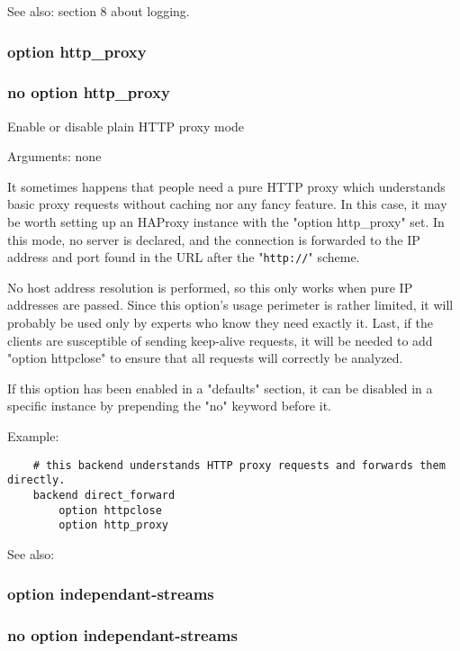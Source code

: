   See also:  section 8 about logging.

\subsubsection[option http\_proxy]{option http\_proxy}
\subsubsection[no option http\_proxy]{no option http\_proxy}


  Enable or disable plain HTTP proxy mode

                                 
  Arguments: none

  It sometimes happens that people need a pure HTTP proxy which understands
  basic proxy requests without caching nor any fancy feature. In this case,
  it may be worth setting up an HAProxy instance with the "option http\_proxy"
  set. In this mode, no server is declared, and the connection is forwarded to
  the IP address and port found in the URL after the "\verb|http://|" scheme.

  No host address resolution is performed, so this only works when pure IP
  addresses are passed. Since this option's usage perimeter is rather limited,
  it will probably be used only by experts who know they need exactly it. Last,
  if the clients are susceptible of sending keep-alive requests, it will be
  needed to add "option httpclose" to ensure that all requests will correctly
  be analyzed.

  If this option has been enabled in a "defaults" section, it can be disabled
  in a specific instance by prepending the "no" keyword before it.

  Example:
\begin{verbatim}
    # this backend understands HTTP proxy requests and forwards them directly.
    backend direct_forward
        option httpclose
        option http_proxy
\end{verbatim}

  See also: 

\subsubsection{option independant-streams}
\subsubsection{no option independant-streams}

